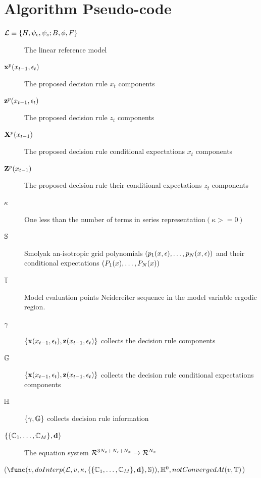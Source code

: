 \documentclass[12pt]{article}
\begin{document}
\section{Algorithm Pseudo-code}
\label{sec:pseudocode}


\begin{description}
\item[${\mathcal{L}}\equiv {\{H,\psi_\epsilon,\psi_c;B,\phi,F\}}$] The linear reference model
\item[$ \mathbf{x}^{p}(x_{t-1},\epsilon_t)$] The proposed decision rule  $x_t$ components
\item[$ \mathbf{z}^{p}(x_{t-1},\epsilon_t)$]The proposed decision rule  $z_t$ components
\item[$ \mathbf{X}^p(x_{t-1})$] The proposed decision rule conditional expectations  $x_t$ components
\item[$ \mathbf{Z}^p(x_{t-1})$] The proposed decision rule their conditional expectations  $z_t$ components
\item[$ \kappa$] One less than the number of terms in series representation$(\kappa>=0)$
\item[$\mathbb{S}$] Smolyak an-isotropic grid polynomials $(p_{1}(x,\epsilon),\ldots,p_{N}(x,\epsilon))$ and their conditional expectations $(P_{1}(x),\ldots,P_{N}(x))$
\item[$\mathbb{T}$] Model evaluation points Neidereiter sequence in the model variable ergodic region.
\item[$ {{\gamma}}$]  $\{\mathbf{x}(x_{t-1},\epsilon_t),\mathbf{z}(x_{t-1},\epsilon_t)\}$ collects the decision rule components
\item[$ {\mathbb{G}}$]  $\{\mathbf{x}(x_{t-1},\epsilon_t),\mathbf{z}(x_{t-1},\epsilon_t)\}$ collects the decision rule conditional expectations components
\item[$\mathbb{H}$] $\{{{\gamma}},{\mathbb{G}}\}$ collects decision rule information
\item[$\{\{\mathbb{C}_{1},\ldots,\mathbb{C}_{M}\},\mathbf{d}\}$] The equation system ${{\mathcal{R}^{3{N_x}+{N_\epsilon}+{N_x}}}\rightarrow{\mathcal{R}^{{N_x}}}}$
\end{description}


\begin{algorithm}
\nestWhile($\func(v,doInterp(\linMod, v, \kappa,\eqnFuncSys,\smolSpec)),\bothFuncs^0,notConvergedAt(v,\mathbb{T})$)\\
\caption{$nestInterp$} 
\label{nestInterp}
\end{algorithm}
\end{document}
